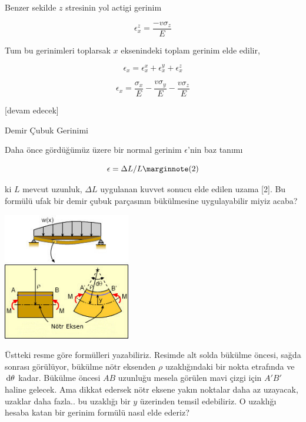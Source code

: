 \documentclass[12pt,fleqn]{article}\usepackage{../../common}
\begin{document}
Benzer sekilde $z$ stresinin yol actigi gerinim

$$
\epsilon_x^z =  \frac{- v \sigma_z}{E}
$$

Tum bu gerinimleri toplarsak $x$ eksenindeki toplam gerinim elde edilir,

$$
\epsilon_x = \epsilon_x^x + \epsilon_x^y + \epsilon_x^z
$$

$$
\epsilon_x = \frac{\sigma_x}{E} - \frac{v \sigma_y}{E} - \frac{v \sigma_z}{E} 
$$




[devam edecek]



























Demir Çubuk Gerinimi

Daha önce gördüğümüz üzere bir normal gerinim $\epsilon$'nin baz tanımı

$$
\epsilon = \Delta L / L
\mlabel{2}
$$

ki $L$ mevcut uzunluk, $\Delta L$ uygulanan kuvvet sonucu elde edilen uzama [2].
Bu formülü ufak bir demir çubuk parçasının bükülmesine uygulayabilir miyiz
acaba? 

\includegraphics[width=15em]{phy_020_strs_00_03.jpg}

Üstteki resme göre formülleri yazabiliriz. Resimde alt solda bükülme öncesi,
sağda sonrası görülüyor, bükülme nötr eksenden $\rho$ uzaklığındaki bir nokta
etrafında ve $\,\mathrm{d}\theta$ kadar. Bükülme öncesi $AB$ uzunluğu mesela görülen mavi
çizgi için $A'B'$ haline gelecek. Ama dikkat edersek nötr eksene yakın noktalar
daha az uzayacak, uzaklar daha fazla.. bu uzaklığı bir $y$ üzerinden temsil
edebiliriz. O uzaklığı hesaba katan bir gerinim formülü nasıl elde ederiz?
\end{document}

